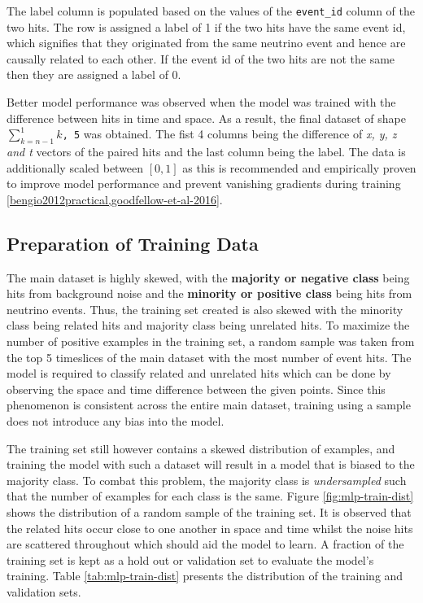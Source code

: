 The label column is populated based on the values of the
\texttt{event\_id} column of the two hits. The row is assigned a label
of 1 if the two hits have the same event id, which signifies that they
originated from the same neutrino event and hence are causally related
to each other. If the event id of the two hits are not the same then
they are assigned a label of 0.

Better model performance was observed when the model was trained with
the difference between hits in time and space. As a result, the final
dataset of shape \texttt{$\sum_{k=n-1}^{1}k$, 5} was obtained. The
fist 4 columns being the difference of \emph{x, y, z and t} vectors of
the paired hits and the last column being the label. The data is
additionally scaled between $[0,1]$ as this is recommended and
empirically proven to improve model performance and prevent vanishing
gradients during training
\ref{bengio2012practical,goodfellow-et-al-2016}.

\subsection{Preparation of Training Data}
\label{sec:mlp-data-prep-train}

The main dataset is highly skewed, with the \textbf{majority or
  negative class} being hits from background noise and the
\textbf{minority or positive class} being hits from neutrino events.
Thus, the training set created is also skewed with the minority class
being related hits and majority class being unrelated hits. To
maximize the number of positive examples in the training set, a random
sample was taken from the top 5 timeslices of the main dataset with
the most number of event hits. The model is required to classify
related and unrelated hits which can be done by observing the space
and time difference between the given points. Since this phenomenon is
consistent across the entire main dataset, training using a sample
does not introduce any bias into the model.

The training set still however contains a skewed distribution of
examples, and training the model with such a dataset will result in a
model that is biased to the majority class. To combat this problem,
the majority class is \emph{undersampled} such that the number of
examples for each class is the same. Figure \ref{fig:mlp-train-dist}
shows the distribution of a random sample of the training set. It is
observed that the related hits occur close to one another in space and
time whilst the noise hits are scattered throughout which should aid
the model to learn. A fraction of the training set is kept as a hold
out or validation set to evaluate the model's training. Table
\ref{tab:mlp-train-dist} presents the distribution of the training and
validation sets.

